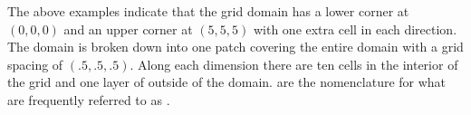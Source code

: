 The above examples indicate that the grid domain has a lower corner at
$(0,0,0)$ and an upper corner at $(5,5,5)$ with one extra cell in each
direction.  The domain is broken down into one patch covering the
entire domain with a grid spacing of $(.5,.5,.5)$.  Along each dimension
there are ten cells in the interior of the grid and one layer of
 outside of the domain.  
are the \Uintah nomenclature for what are frequently referred to 
as .
